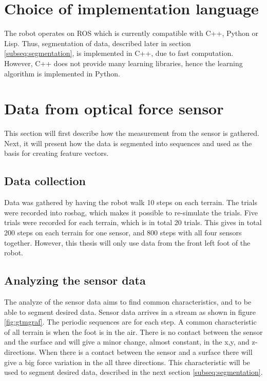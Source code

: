 \documentclass[USenglish]{ifimaster}  %
\begin{document}
\section{Choice of implementation language}
The robot operates on ROS which is currently compatible with C++, Python or Lisp. Thus, segmentation of data, described later in section \ref{subseq:segmentation}, is implemented in C++, due to fast computation. However, C++ does not provide many learning libraries, hence the learning algorithm is implemented in Python. 
			
\section{Data from optical force sensor}
This section will first describe how the measurement from the sensor is gathered. Next, it will present how the data is segmented into sequences and used as the basis for creating feature vectors.
	
\subsection{Data collection}
Data was gathered by having the robot walk 10 steps on each terrain. The trials were recorded into rosbag, which makes it possible to re-simulate the trials. Five trials were recorded for each terrain, which is in total 20 trials. This gives in total 200 steps on each terrain for one sensor, and 800 steps with all four sensors together. However, this thesis will only use data from the front left foot of the robot.
	
\subsection{Analyzing the sensor data}\label{sec:analyzopto}
The analyze of the sensor data aims to find common characteristics, and to be able to segment desired data. Sensor data arrives in a stream as shown in figure \ref{fig:gtmgraf}. The periodic sequences are for each step. A common characteristic of all terrain is when the foot is in the air. There is no contact between the sensor and the surface and will give a minor change, almost constant, in the x,y, and z-directions. When there is a contact between the sensor and a surface there will give a big force variation in the all three directions. This characteristic will be used to segment desired data, described in the next section \ref{subseq:segmentation}.
\end{document}
